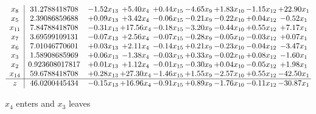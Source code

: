 \documentclass[9pt]{article}
\begin{document}
 \[\begin{array}{c| c c@{\hskip 2pt} c@{\hskip 2pt} c@{\hskip 2pt} c@{\hskip 2pt} c@{\hskip 2pt} c@{\hskip 2pt} c@{\hskip 2pt} }
 x_{8}   &  31.2788418708 & -1.52 x_{13} & +  5.40 x_{4} & +  0.44 x_{15} & -4.65 x_{9} & +  1.83 x_{10} & -1.15 x_{12} & + 22.90 x_{1}\\
 x_{5}   &  2.39086859688 & +  0.09 x_{13} & +  3.42 x_{4} & -0.06 x_{15} & -0.21 x_{9} & -0.22 x_{10} & +  0.04 x_{12} & -0.52 x_{1}\\
 x_{11}   &  7.84788418708 & -0.31 x_{13} & + 17.56 x_{4} & -0.18 x_{15} & -3.20 x_{9} & -0.44 x_{10} & +  0.55 x_{12} & +  7.17 x_{1}\\
 x_{7}   &  3.69599109131 & -0.07 x_{13} & +  2.56 x_{4} & -0.07 x_{15} & -0.28 x_{9} & -0.05 x_{10} & -0.03 x_{12} & +  0.07 x_{1}\\
 x_{6}   &  7.01046770601 & +  0.03 x_{13} & +  2.11 x_{4} & -0.14 x_{15} & +  0.21 x_{9} & -0.23 x_{10} & -0.04 x_{12} & -3.47 x_{1}\\
 x_{3}   &  1.58908685969 & +  0.06 x_{13} & -1.38 x_{4} & -0.03 x_{15} & +  0.33 x_{9} & -0.02 x_{10} & +  0.08 x_{12} & -1.60 x_{1}\\
 x_{2}   &  0.923608017817 & +  0.01 x_{13} & +  1.12 x_{4} & -0.01 x_{15} & -0.30 x_{9} & +  0.04 x_{10} & -0.05 x_{12} & +  1.98 x_{1}\\
 x_{14}   &  59.6788418708 & +  0.28 x_{13} & + 27.30 x_{4} & -1.46 x_{15} & +  1.55 x_{9} & -2.57 x_{10} & +  0.55 x_{12} & -42.50 x_{1}\\
\hline
z    &  46.0200445434 & -0.15 x_{13} & + 16.96 x_{4} & -0.91 x_{15} & +  0.89 x_{9} & -1.76 x_{10} & -0.11 x_{12} & -30.87 x_{1}\\
\end{array}\]


 $ x_{4} $ enters and $ x_{3} $ leaves 
\end{document}
